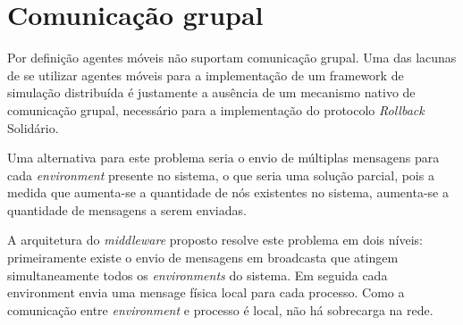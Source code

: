 \section{Comunicação grupal}

Por definição agentes móveis não suportam comunicação grupal. Uma das lacunas de se utilizar agentes móveis para a implementação de um framework de simulação distribuída é justamente a ausência de um mecanismo nativo de comunicação grupal, necessário para a implementação do protocolo \textit{Rollback} Solidário.

Uma alternativa para este problema seria o envio de múltiplas mensagens para cada \textit{environment} presente no sistema, o que seria uma solução parcial, pois a medida que aumenta-se a quantidade de nós existentes no sistema, aumenta-se a quantidade de mensagens a serem enviadas.

A arquitetura do \textit{middleware} proposto resolve este problema em dois níveis: primeiramente existe o envio de mensagens em broadcasta que atingem simultaneamente todos os \textit{environments} do sistema. Em seguida cada environment envia uma mensage física local para cada processo. Como a comunicação entre \textit{environment} e processo é local, não há sobrecarga na rede.
